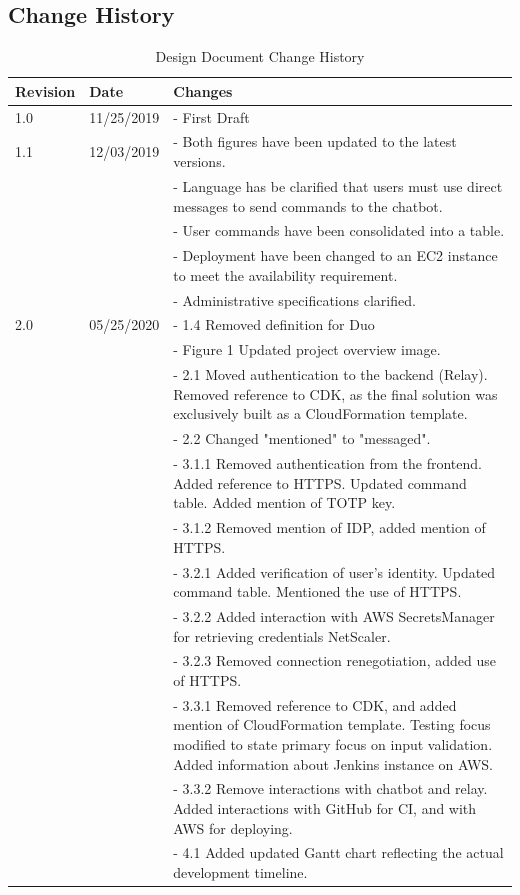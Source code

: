 \subsection {Change History}
\begin{longtable}{ | p{1in} p{1in} p{4in} | }
 \caption{Design Document Change History}
 \\\hline
 \textbf{Revision} & \textbf{Date} & \textbf{Changes} \\
 \hline
 1.0 & 11/25/2019 
   & - First Draft\\
 \hline
 1.1 & 12/03/2019 
   & - Both figures have been updated to the latest versions.\\
 & & - Language has be clarified that users must use direct messages to send commands to the chatbot.\\
 & & - User commands have been consolidated into a table.\\
 & & - Deployment have been changed to an EC2 instance to meet the availability requirement.\\
 & & - Administrative specifications clarified. \\
 \hline
 2.0 & 05/25/2020 
   & - 1.4 Removed definition for Duo\\
 & & - Figure 1 Updated project overview image.\\
 & & - 2.1 Moved authentication to the backend (Relay). Removed reference to CDK, as the final solution was exclusively built as a CloudFormation template.\\
 & & - 2.2 Changed "mentioned" to "messaged".\\
 & & - 3.1.1 Removed authentication from the frontend. Added reference to HTTPS. Updated command table. Added mention of TOTP key.\\
 & & - 3.1.2 Removed mention of IDP, added mention of HTTPS.\\
 & & - 3.2.1 Added verification of user's identity. Updated command table. Mentioned the use of HTTPS.\\
 & & - 3.2.2 Added interaction with AWS SecretsManager for retrieving credentials NetScaler.\\
 & & - 3.2.3 Removed connection renegotiation, added use of HTTPS.\\
 & & - 3.3.1 Removed reference to CDK, and added mention of CloudFormation template. Testing focus modified to state primary focus on input validation. Added information about Jenkins instance on AWS.\\
 & & - 3.3.2 Remove interactions with chatbot and relay. Added interactions with GitHub for CI, and with AWS for deploying.\\
 & & - 4.1 Added updated Gantt chart reflecting the actual development timeline. \\
 \hline
\end{longtable}

